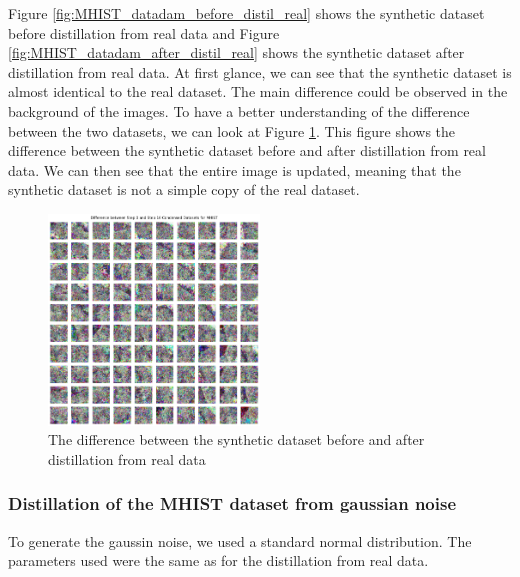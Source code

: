 \documentclass[onecolumn]{IEEEtran}
\begin{document}
Figure \ref{fig:MHIST_datadam_before_distil_real} shows the synthetic dataset before distillation from real data and Figure \ref{fig:MHIST_datadam_after_distil_real} shows the synthetic dataset after distillation from real data. At first glance, we can see that the synthetic dataset is almost identical to the real dataset. The main difference could be observed in the background of the images. To have a better understanding of the difference between the two datasets, we can look at Figure \ref{fig:MHIST_diff_real}. This figure shows the difference between the synthetic dataset before and after distillation from real data. We can then see that the entire image is updated, meaning that the synthetic dataset is not a simple copy of the real dataset.

\begin{figure}[H]
    \centering
    \includegraphics[width=0.5\textwidth]{images/MHIST_diff_real.png}
    \caption{The difference between the synthetic dataset before and after distillation from real data}
    \label{fig:MHIST_diff_real}
\end{figure}

\subsubsection{Distillation of the MHIST dataset from gaussian noise}
To generate the gaussin noise, we used a standard normal distribution. The parameters used were the same as for the distillation from real data.
\end{document}
